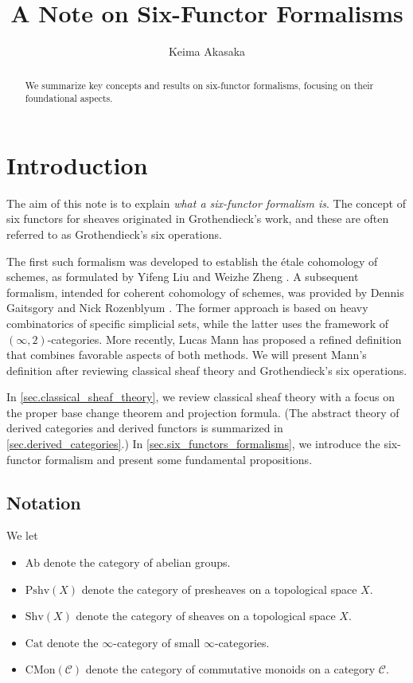 \documentclass[a4paper,dvipdfmx,11pt,reqno]{amsart}
\newcommand{\C}{\mathcal{C}}
\newcommand{\Ab}{\mathrm{Ab}}
\newcommand{\Cat}{\mathrm{Cat}}
\newcommand{\CMon}{\mathrm{CMon}}
\newcommand{\Pshv}{\mathrm{Pshv}}
\newcommand{\Shv}{\mathrm{Shv}}
\theoremstyle{definition}
\begin{document}
\title{A Note on Six-Functor Formalisms}
\author{Keima Akasaka}
\maketitle 

\begin{abstract}
  We summarize key concepts and results on six-functor formalisms, focusing on their foundational aspects.
\end{abstract} 

\setcounter{tocdepth}{2} %
\tableofcontents   

\section{Introduction}

The aim of this note is to explain \textit{what a six-functor formalism is}. 
The concept of six functors for sheaves originated in Grothendieck's work, and these are often referred to as Grothendieck's six operations.

The first such formalism was developed to establish the \'{e}tale cohomology of schemes, as formulated by Yifeng Liu and Weizhe Zheng \cite{LZ17}.
A subsequent formalism, intended for coherent cohomology of schemes, was provided by Dennis Gaitsgory and Nick Rozenblyum \cite{GR17}. 
The former approach is based on heavy combinatorics of specific simplicial sets, while the latter uses the framework of $(\infty,2)$-categories. 
More recently, Lucas Mann \cite{Mann22} has proposed a refined definition that combines favorable aspects of both methods.
We will present Mann's definition after reviewing classical sheaf theory and Grothendieck's six operations.

In \cref{sec.classical_sheaf_theory}, we review classical sheaf theory with a focus on the proper base change theorem and projection formula. 
(The abstract theory of derived categories and derived functors is summarized in \cref{sec.derived_categories}.) 
In \cref{sec.six_functors_formalisms}, we introduce the six-functor formalism and present some fundamental propositions.

\subsection{Notation}

We let 
\begin{itemize}
  \item $\Ab$ denote the category of abelian groups.
  \item $\Pshv(X)$ denote the category of presheaves on a topological space $X$.
  \item $\Shv(X)$ denote the category of sheaves on a topological space $X$.
  \item $\Cat$ denote the $\infty$-category of small $\infty$-categories.
  \item $\CMon(\C)$ denote the category of commutative monoids on a category $\C$.
\end{itemize}
\end{document}
